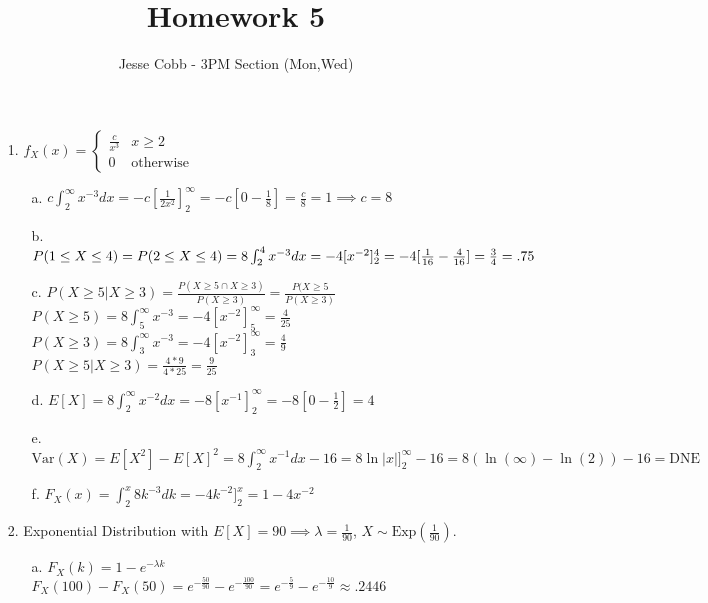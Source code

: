 \documentclass[11pt]{amsart}
\theoremstyle{definition}
\begin{document}
\title{Homework 5}

\author{Jesse Cobb - 3PM Section (Mon,Wed)}

\maketitle

\begin{itemize}

\item[1.]$f_X(x)=\begin{cases}
    \frac c{x^3} &x\ge 2 \\
    0 &\text{otherwise}
\end{cases}$
\begin{itemize}
    \item[a.] $c\int_2^\infty x^{-3}dx=-c[\frac {1}{2x^2}]_2^\infty=-c[0-\frac1{8}]=\frac c8=1\implies c=8$

    \item[b.] $P(1\le X\le 4)=P(2\le X\le 4)\\=8\int_2^4x^{-3}dx=-4[x^{-2}]_2^4=-4[\frac 1{16}-\frac{4}{16}]=\frac{3}{4}=.75$

    \item[c.] $P(X\ge 5|X\ge 3)=\frac{P(X\ge 5\cap X\ge 3)}{P(X\ge 3)}=\frac{P(X\ge 5}{P(X\ge 3)}$ \\
              $P(X\ge 5)=8\int_5^\infty x^{-3}=-4[x^{-2}]_5^\infty=\frac{4}{25}$ \\
              $P(X\ge 3)=8\int_3^\infty x^{-3}=-4[x^{-2}]_3^\infty=\frac{4}{9}$ \\
              $P(X\ge 5|X\ge 3)=\frac{4*9}{4*25}=\frac 9{25}$

    \item[d.] $E[X]=8\int_2^\infty x^{-2}dx=-8[x^{-1}]_2^\infty=-8[0-\frac 12]=4$

    \item[e.] $\text{Var}(X)=E[X^2]-E[X]^2=8\int_2^\infty x^{-1}dx-16=8\ln|x|]_2^\infty-16=8(\ln(\infty)-\ln(2))-16=\text{DNE}$

    \item[f.] $F_X(x)=\int_2^x8k^{-3}dk=-4k^{-2}]_2^x=1-4x^{-2}$
    
\end{itemize}

\item[2.] Exponential Distribution with $E[X]=90\implies \lambda =\frac 1{90}$, $X\sim\text{Exp}(\frac 1{90})$.
\begin{itemize}
    \item[a.] $F_X(k)=1-e^{-\lambda k}$ \\
              $F_X(100)-F_X(50)=e^{-\frac{50}{90}}-e^{-\frac{100}{90}}=e^{-\frac59}-e^{-\frac{10}9}\approx .2446$


\end{itemize}
\end{itemize}
\end{document}
